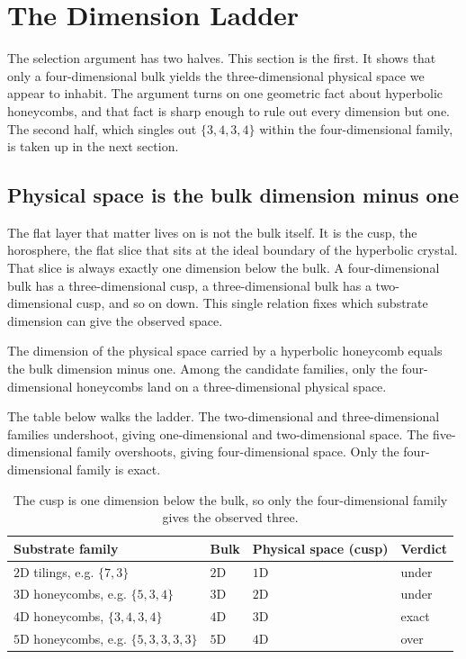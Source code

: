 \section{The Dimension Ladder}

The selection argument has two halves. This section is the first. It shows that only a four-dimensional bulk
yields the three-dimensional physical space we appear to inhabit. The argument turns on one geometric fact about
hyperbolic honeycombs, and that fact is sharp enough to rule out every dimension but one. The second half, which
singles out $\{3,4,3,4\}$ within the four-dimensional family, is taken up in the next section.

\subsection{Physical space is the bulk dimension minus one}

The flat layer that matter lives on is not the bulk itself. It is the cusp, the horosphere, the flat slice that
sits at the ideal boundary of the hyperbolic crystal. That slice is always exactly one dimension below the bulk.
A four-dimensional bulk has a three-dimensional cusp, a three-dimensional bulk has a two-dimensional cusp, and so
on down. This single relation fixes which substrate dimension can give the observed space.

\begin{proposition}
The dimension of the physical space carried by a hyperbolic honeycomb equals the bulk dimension minus one. Among
the candidate families, only the four-dimensional honeycombs land on a three-dimensional physical space.
\end{proposition}

The table below walks the ladder. The two-dimensional and three-dimensional families undershoot, giving
one-dimensional and two-dimensional space. The five-dimensional family overshoots, giving four-dimensional space.
Only the four-dimensional family is exact.

\begin{table}[ht]
\centering
\begin{tabular}{llll}
\toprule
Substrate family & Bulk & Physical space (cusp) & Verdict \\
\midrule
$2$D tilings, e.g. $\{7,3\}$ & $2$D & $1$D & under \\
$3$D honeycombs, e.g. $\{5,3,4\}$ & $3$D & $2$D & under \\
$4$D honeycombs, $\{3,4,3,4\}$ & $4$D & $3$D & exact \\
$5$D honeycombs, e.g. $\{5,3,3,3,3\}$ & $5$D & $4$D & over \\
\bottomrule
\end{tabular}
\caption{The cusp is one dimension below the bulk, so only the four-dimensional family gives the observed three.}
\end{table}

